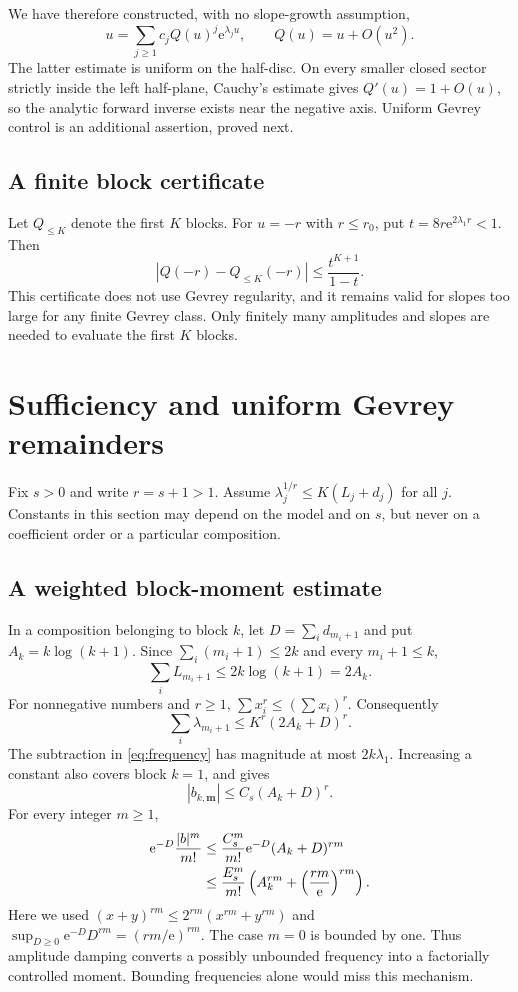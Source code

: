 \documentclass[11pt,a4paper]{article}
\numberwithin{equation}{section}
\theoremstyle{definition}
\theoremstyle{remark}
\theoremstyle{definition}
\newcommand{\e}{\mathrm e}
\begin{document}
We have therefore constructed, with no slope-growth assumption,
\begin{equation}
 u=\sum_{j\ge1}c_jQ(u)^j\e^{\lambda_j u},\qquad
 Q(u)=u+O(u^2).
 \label{eq:literal-inverse}
\end{equation}
The latter estimate is uniform on the half-disc. On every smaller closed
sector strictly inside the left half-plane, Cauchy's estimate gives
$Q'(u)=1+O(u)$, so the analytic forward inverse exists near the negative
axis. Uniform Gevrey control is an additional assertion, proved next.

\subsection{A finite block certificate}
Let $Q_{\le K}$ denote the first $K$ blocks. For $u=-r$ with $r\le r_0$,
put $t=8r\e^{2\lambda_1r}<1$. Then
\begin{equation}
 |Q(-r)-Q_{\le K}(-r)|\le\frac{t^{K+1}}{1-t}.
 \label{eq:block-certificate}
\end{equation}
This certificate does not use Gevrey regularity, and it remains valid
for slopes too large for any finite Gevrey class. Only finitely many
amplitudes and slopes are needed to evaluate the first $K$ blocks.

\section{Sufficiency and uniform Gevrey remainders}
\label{sec:sufficiency}

Fix $s>0$ and write $r=s+1>1$. Assume
$\lambda_j^{1/r}\le K(L_j+d_j)$ for all $j$. Constants in this section
may depend on the model and on $s$, but never on a coefficient order or
a particular composition.

\subsection{A weighted block-moment estimate}
In a composition belonging to block $k$, let $D=\sum_i d_{m_i+1}$ and
put $A_k=k\log(k+1)$. Since $\sum_i(m_i+1)\le2k$ and every $m_i+1\le k$,
\[
 \sum_i L_{m_i+1}\le 2k\log(k+1)=2A_k.
\]
For nonnegative numbers and $r\ge1$, $\sum x_i^r\le(\sum x_i)^r$.
Consequently
\[
 \sum_i\lambda_{m_i+1}\le K^r(2A_k+D)^r.
\]
The subtraction in \eqref{eq:frequency} has magnitude at most
$2k\lambda_1$. Increasing a constant also covers block $k=1$, and gives
\begin{equation}
 |b_{k,\mathbf m}|\le C_s(A_k+D)^r.
 \label{eq:weighted-frequency}
\end{equation}
For every integer $m\ge1$,
\begin{align}
 \e^{-D}\frac{|b|^m}{m!}
 &\le \frac{C_s^m}{m!}\e^{-D}(A_k+D)^{rm}\notag\\
 &\le\frac{E_s^m}{m!}
       \left(A_k^{rm}+\left(\frac{rm}{\e}\right)^{rm}\right).
 \label{eq:moment-budget}
\end{align}
Here we used $(x+y)^{rm}\le2^{rm}(x^{rm}+y^{rm})$ and
$\sup_{D\ge0}\e^{-D}D^{rm}=(rm/\e)^{rm}$. The case $m=0$ is bounded by
one. Thus amplitude damping converts a possibly unbounded frequency into
a factorially controlled moment. Bounding frequencies alone would miss
this mechanism.
\end{document}
